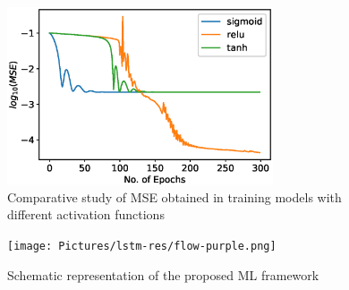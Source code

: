 \begin{figure}[!h]
	\centering
	\includegraphics[width=0.7\textwidth]{Pictures/lstm-res/lstm-sctivations_log.eps}
	\hspace{1mm}
	\caption{Comparative study of MSE obtained in training models with different activation functions} 
	\label{fig:diff-activation-lstm}
\end{figure}
\begin{figure}
	\texttt{[image: Pictures/lstm-res/flow-purple.png]}
	\hspace{1mm}
	\caption{Schematic representation of the proposed ML framework} 
	\label{fig:flow-chart}
\end{figure}

